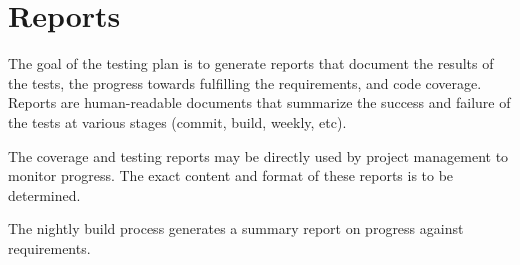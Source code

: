 %
%
\section{Reports}
\label{sec:reports}

The goal of the testing plan is to generate reports that document the results of the tests, the progress towards fulfilling the requirements, and code coverage. Reports are human-readable documents that summarize the success and failure of the tests at various stages (commit, build, weekly, etc).

The coverage and testing reports may be directly used by project management to monitor progress. The exact content and format of these reports is to be determined.

The nightly build process generates a summary report on progress
against requirements.

%
%
